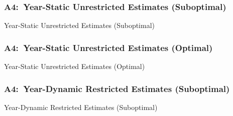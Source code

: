 \documentclass[12pt, aspectratio=169]{beamer}
\begin{document}
\begin{frame}[label=ysues]
\frametitle{A4:\ Year-Static Unrestricted Estimates (Suboptimal)}
\begin{table}[htbp]
  \centering
  \renewcommand{\thetable}{\arabic{table}a}
  \caption{Year-Static Unrestricted Estimates (Suboptimal)}
  \vspace{5pt}
  \begin{adjustbox}{totalheight=.7\textheight}

  \end{adjustbox}
\end{table}%
\hyperlink{ydues}{}
\end{frame}

\begin{frame}[label=ysueo]
\frametitle{A4:\ Year-Static Unrestricted Estimates (Optimal)}
\addtocounter{framenumber}{-1}
\begin{table}[htbp]
  \centering
  \addtocounter{table}{-1}
  \renewcommand{\thetable}{\arabic{table}b}
  \caption{Year-Static Unrestricted Estimates (Optimal)}
  \vspace{5pt}
  \begin{adjustbox}{totalheight=.7\textheight}

  \end{adjustbox}
\end{table}%
\hyperlink{ydueo}{}
\end{frame}

\begin{frame}[label=ydres]
\frametitle{A4:\ Year-Dynamic Restricted Estimates (Suboptimal)}
\begin{table}[htbp]
  \centering
  \vspace{-5pt}
  \renewcommand{\thetable}{\arabic{table}a}
  \caption{Year-Dynamic Restricted Estimates (Suboptimal)}
  \vspace{5pt}
  \begin{adjustbox}{totalheight=.7\textheight}

  \end{adjustbox}
\end{table}%
\hyperlink{ysres}{}
\end{frame}
\end{document}

